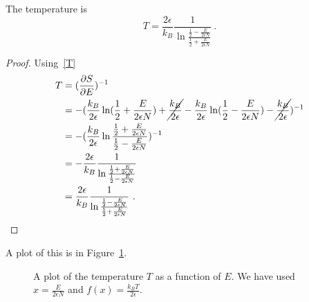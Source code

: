     The temperature is 
    \begin{equation*}
        T = \frac{2 \epsilon}{k_B} \frac{1}{\ln \frac{\frac{1}{2} - \frac{E}{2 \epsilon N}}{\frac{1}{2} + \frac{E}{2 \epsilon N}}} ~.
    \end{equation*}
    \begin{proof}
        Using~\eqref{T}
        \begin{equation*}
        \begin{aligned}
            T & = (\frac{\partial S}{\partial E})^{-1} \\ & = - (\frac{k_B}{2\epsilon} \ln (\frac{1}{2} + \frac{E}{2 \epsilon N}) + \cancel{\frac{k_B}{2\epsilon}} - \frac{k_B}{2\epsilon} \ln (\frac{1}{2} - \frac{E}{2 \epsilon N}) - \cancel{\frac{k_B}{2\epsilon}} )^{-1} \\ & = - (\frac{k_B}{2\epsilon} \ln \frac{\frac{1}{2} + \frac{E}{2 \epsilon N}}{\frac{1}{2} - \frac{E}{2 \epsilon N}})^{-1} \\ & = - \frac{2 \epsilon}{k_B} \frac{1}{\ln \frac{\frac{1}{2} + \frac{E}{2 \epsilon N}}{\frac{1}{2} - \frac{E}{2 \epsilon N}}} \\ & = \frac{2 \epsilon}{k_B} \frac{1}{\ln \frac{\frac{1}{2} - \frac{E}{2 \epsilon N}}{\frac{1}{2} + \frac{E}{2 \epsilon N}}} ~.
        \end{aligned}
        \end{equation*}
    \end{proof}
    A plot of this is in Figure~\ref{en:t}.
    \begin{figure}
        \centering
        \caption{A plot of the temperature $T$ as a function of $E$. We have used $x = \frac{E}{2 \epsilon N} $ and $f(x) = \frac{k_B T}{2 \epsilon}$.}
        \label{en:t}
    \end{figure}
